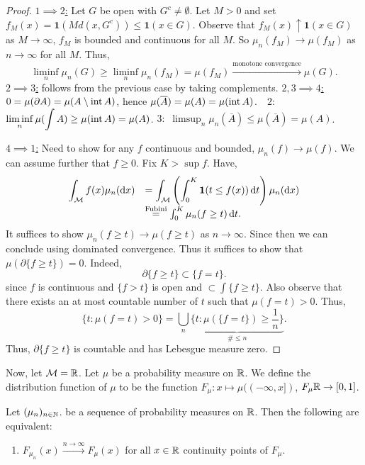 \documentclass{article}
\begin{document}
\begin{proof}
	\underline{$ 1\implies 2$:} Let $ G$ be open with $ G^{c}\neq \emptyset$. Let $ M>0$ and set $ f_{M}(x) = \mathbf{1}(M d(x, G^{c}))\leq \mathbf{1}(x\in G)$. Observe that 	$ f_{M}(x)\uparrow \mathbf{1}(x\in G)$ as $ M\to \infty$, $ f_{M}$ is bounded and continuous for all $ M$. So $ \mu_{n}(f_{M})\to \mu(f_{M})$ as $ n\to \infty$ for all $ M$. Thus, 
	\[
		\displaystyle\liminf_{n}\mu_{n}(G)\geq \displaystyle\liminf_{n}\mu_{n}(f_{M}) = \mu(f_{M})\stackrel{\text{monotone convergence}}{\to}\mu(G).
	\]
	\underline{$2\implies 3$:} follows from the previous case by taking complements. 
	\underline{$ 2,3\implies 4$:} $ 0 = \mu(\partial A) = \mu(A\setminus \operatorname{int}{A})$, hence $ \mu(\overline{A}) = \mu(A) = \mu(\operatorname{int}{A})$.\ \ 
	\underline{$ 2:$} $ \displaystyle\liminf_{n}\mu(\int{A})\geq \mu(\operatorname{int}{A})=\mu(A)$.
	\underline{$ 3:$} $ \displaystyle\limsup_{n} \mu_{n}(\overline{A})\leq \mu(\overline{A}) = \mu(A)$.

	\underline{$ 4\implies 1$:} Need to show for any $ f$ continuous and bounded, $ \mu_{n}(f)\to \mu(f)$. We can assume further that $ f\geq 0$. Fix $ K> \displaystyle\sup f$. Have, 
	\[
	\begin{array}{ll}
		\displaystyle\int_{ \mathcal{M}}f(x) \mu_{n}(\operatorname{d}\! x)    &= \displaystyle\int_{ \mathcal{M}} \left( \int^{K}_{0} \mathbf{1}(t\leq f(x)) \operatorname{d}\! t \right) \mu_{n}(\operatorname{d}\!  x)  \\
									 &\stackrel{\text{Fubini}}{=} \int^{K}_{0}\mu_{n}(f\geq t) \operatorname{d}\! t.  
	\end{array}
	\]
	It suffices to show $ \mu_{n}(f\geq t)\to \mu(f \geq t)$ as $ n\to \infty$. Since then we can conclude using dominated convergence. Thus it suffices to show that $ \mu(\partial \{f\geq t\}) = 0$. Indeed, 
	\[
		\partial\{f\geq t \} \subset \{f = t\}.
	\]
	since $ f$ is continuous and $ \{f>t\}$ is open and $ \subset \int\{f\geq t\}$. Also observe that there exists an at most countable number of $ t$ such that $ \mu(f = t)>0$. Thus, 
	\[
	\{t: \mu(f=t)>0\} = \displaystyle\bigcup_{n}\displaystyle\underbrace{\{t: \mu(\{f = t\})\geq \frac{1}{n}\}}_{\#\leq n} .
	\]
	Thus, $ \partial \{f\geq t\}$ is countable and has Lebesgue measure zero.
\end{proof}

Now, let $ \mathcal{M} = \mathbb{R}$. Let $ \mu$ be a probability measure on $ \mathbb{R}$. We define the distribution function of $ \mu$ to be the function $ F_{\mu}:x\mapsto \mu((-\infty,x] )$, $ F_{\mu}\mathbb{R}\to [0,1]$. 


\begin{boxprop}\label{prop: weak convergence distribution function}
	Let $ (\mu_{n})_{n\in \mathbb{N}}$. be a sequence of probability measures on $ \mathbb{R}$. Then the following are equivalent: 
	\begin{enumerate}
	    $ \mu_{n}\implies \mu$, as $ n\to \infty$.
	    \item $F_{\mu_{n}}(x)\stackrel{n\to \infty}{\longrightarrow}F_{\mu}(x)$ for all $ x\in \mathbb{R}$ continuity points of $ F_{\mu}$.
	\end{enumerate}
\end{boxprop}
\end{document}
